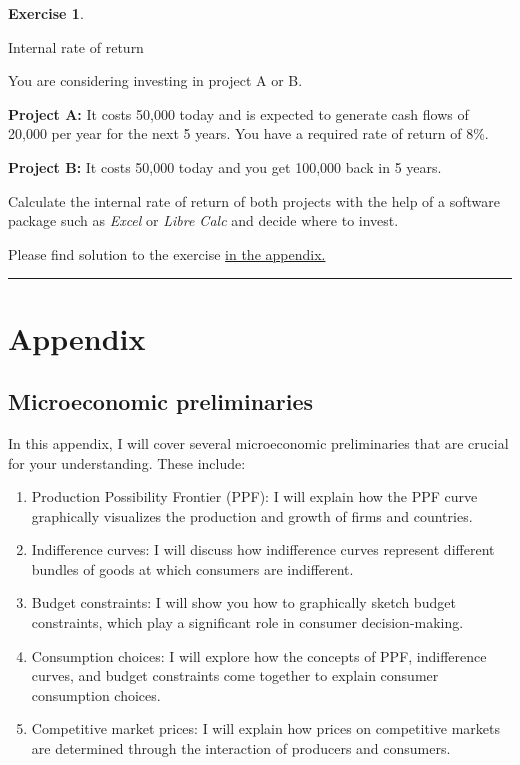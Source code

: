 \documentclass[
  12pt,
  oneside]{book}
\providecommand{\tightlist}{%
  \setlength{\itemsep}{0pt}\setlength{\parskip}{0pt}}
\theoremstyle{definition}
\theoremstyle{definition}
\theoremstyle{definition}
\newtheorem{exercise}{Exercise}[chapter]
\theoremstyle{definition}
\theoremstyle{remark}
\begin{document}
\begin{exercise}
\protect\hypertarget{exr:irr}{}\label{exr:irr}

Internal rate of return

You are considering investing in project A or B.

\textbf{Project A:} It costs 50,000 today and is expected to generate cash flows of 20,000 per year for the next 5 years. You have a required rate of return of 8\%.

\textbf{Project B:} It costs 50,000 today and you get 100,000 back in 5 years.

Calculate the internal rate of return of both projects with the help of a software package such as \emph{Excel} or \emph{Libre Calc} and decide where to invest.

Please find solution to the exercise \protect\hyperlink{sol:irr}{in the appendix.}

\begin{center}\rule{0.5\linewidth}{0.5pt}\end{center}

\end{exercise}

\hypertarget{appendix}{%
\chapter{Appendix}\label{appendix}}

\hypertarget{microeconomic-preliminaries}{%
\section{Microeconomic preliminaries}\label{microeconomic-preliminaries}}

In this appendix, I will cover several microeconomic preliminaries that are crucial for your understanding. These include:

\begin{enumerate}
\def\labelenumi{\arabic{enumi}.}
\tightlist
\item
  Production Possibility Frontier (PPF): I will explain how the PPF curve graphically visualizes the production and growth of firms and countries.
\item
  Indifference curves: I will discuss how indifference curves represent different bundles of goods at which consumers are indifferent.
\item
  Budget constraints: I will show you how to graphically sketch budget constraints, which play a significant role in consumer decision-making.
\item
  Consumption choices: I will explore how the concepts of PPF, indifference curves, and budget constraints come together to explain consumer consumption choices.
\item
  Competitive market prices: I will explain how prices on competitive markets are determined through the interaction of producers and consumers.
\end{enumerate}
\end{document}
